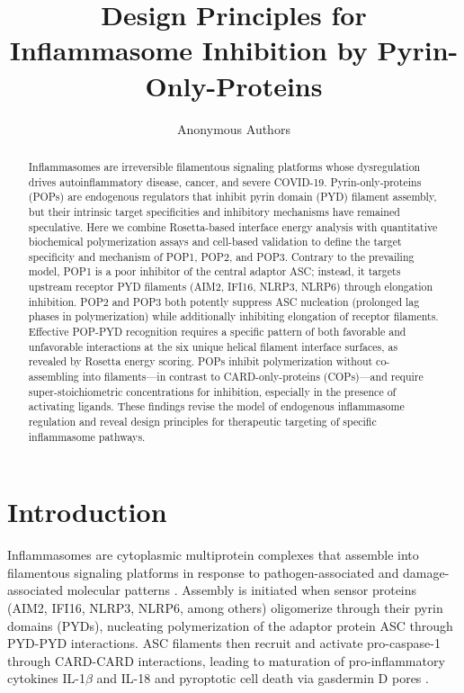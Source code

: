 \documentclass[11pt]{article}
\title{Design Principles for Inflammasome Inhibition by Pyrin-Only-Proteins}
\author{Anonymous Authors}
\date{}
\begin{document}
\maketitle

\begin{abstract}
Inflammasomes are irreversible filamentous signaling platforms whose dysregulation drives autoinflammatory disease, cancer, and severe COVID-19. Pyrin-only-proteins (POPs) are endogenous regulators that inhibit pyrin domain (PYD) filament assembly, but their intrinsic target specificities and inhibitory mechanisms have remained speculative. Here we combine Rosetta-based interface energy analysis with quantitative biochemical polymerization assays and cell-based validation to define the target specificity and mechanism of POP1, POP2, and POP3. Contrary to the prevailing model, POP1 is a poor inhibitor of the central adaptor ASC; instead, it targets upstream receptor PYD filaments (AIM2, IFI16, NLRP3, NLRP6) through elongation inhibition. POP2 and POP3 both potently suppress ASC nucleation (prolonged lag phases in polymerization) while additionally inhibiting elongation of receptor filaments. Effective POP-PYD recognition requires a specific pattern of both favorable and unfavorable interactions at the six unique helical filament interface surfaces, as revealed by Rosetta energy scoring. POPs inhibit polymerization without co-assembling into filaments---in contrast to CARD-only-proteins (COPs)---and require super-stoichiometric concentrations for inhibition, especially in the presence of activating ligands. These findings revise the model of endogenous inflammasome regulation and reveal design principles for therapeutic targeting of specific inflammasome pathways.
\end{abstract}

\section{Introduction}

Inflammasomes are cytoplasmic multiprotein complexes that assemble into filamentous signaling platforms in response to pathogen-associated and damage-associated molecular patterns \citep{lu2014unified, stehlik2017review}. Assembly is initiated when sensor proteins (AIM2, IFI16, NLRP3, NLRP6, among others) oligomerize through their pyrin domains (PYDs), nucleating polymerization of the adaptor protein ASC through PYD-PYD interactions. ASC filaments then recruit and activate pro-caspase-1 through CARD-CARD interactions, leading to maturation of pro-inflammatory cytokines IL-1$\beta$ and IL-18 and pyroptotic cell death via gasdermin D pores \citep{sborgi2015gsdmd}.
\end{document}
